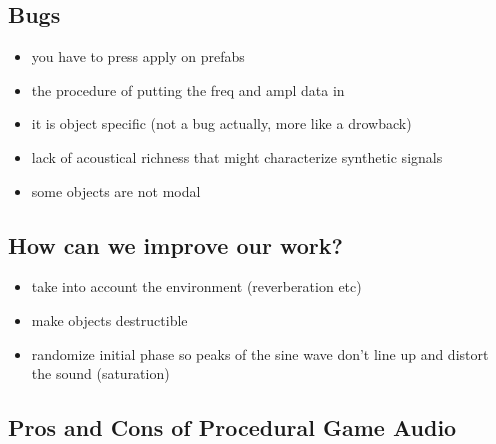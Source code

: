 \subsection{Bugs}
\begin{itemize}
\item you have to press apply on prefabs
\item the procedure of putting the freq and ampl data in
\item it is object specific (not a bug actually, more like a drowback)
\item lack of acoustical richness that might characterize synthetic signals \cite{giordano2006material}
\item some objects are not modal
\end{itemize}

\subsection{How can we improve our work?}
\begin{itemize}
\item take into account the environment (reverberation etc)
\item make objects destructible
\item randomize initial phase so peaks of the sine wave don't line up and distort the sound (saturation)
\end{itemize}

\subsection{Pros and Cons of Procedural Game Audio}